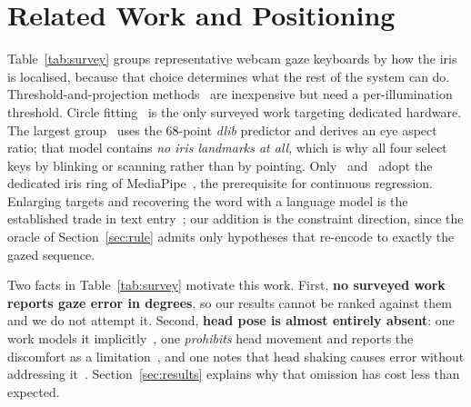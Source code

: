 \documentclass[conference]{IEEEtran}
\begin{document}
\section{Related Work and Positioning}

Table~\ref{tab:survey} groups representative webcam gaze keyboards by how the
iris is localised, because that choice determines what the rest of the system
can do. Threshold-and-projection methods~\cite{ref08} are inexpensive but need a
per-illumination threshold. Circle fitting~\cite{ref09} is the only surveyed
work targeting dedicated hardware. The largest
group~\cite{ref02,ref03,ref05,ref07} uses the 68-point \emph{dlib} predictor and
derives an eye aspect ratio; that model contains \emph{no iris landmarks at
all}, which is why all four select keys by blinking or scanning rather than by
pointing. Only~\cite{ref04} and~\cite{ref06} adopt the dedicated iris ring of
MediaPipe~\cite{ref10}, the prerequisite for continuous regression. Enlarging targets and
recovering the word with a language model is the established trade in text
entry~\cite{ref17}; our addition is the constraint direction, since the oracle
of Section~\ref{sec:rule} admits only hypotheses that re-encode to exactly the
gazed sequence.

Two facts in Table~\ref{tab:survey} motivate this work. First, \textbf{no
surveyed work reports gaze error in degrees}, so our results cannot be ranked
against them and we do not attempt it. Second, \textbf{head pose is almost
entirely absent}: one work models it implicitly~\cite{ref01}, one
\emph{prohibits} head movement and reports the discomfort as a
limitation~\cite{ref02}, and one notes that head shaking causes error without
addressing it~\cite{ref09b}. Section~\ref{sec:results} explains why that
omission has cost less than expected.
\end{document}
